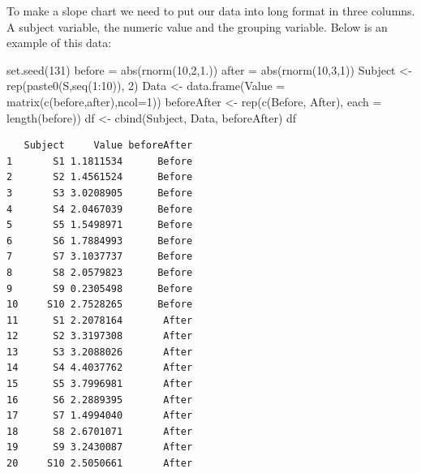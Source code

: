 \documentclass[
  letterpaper,
  DIV=11,
  numbers=noendperiod]{scrreprt}
\newenvironment{Shaded}{\begin{snugshade}}{\end{snugshade}}
\newcommand{\AttributeTok}[1]{\textcolor[rgb]{0.40,0.45,0.13}{#1}}
\newcommand{\DecValTok}[1]{\textcolor[rgb]{0.68,0.00,0.00}{#1}}
\newcommand{\FloatTok}[1]{\textcolor[rgb]{0.68,0.00,0.00}{#1}}
\newcommand{\FunctionTok}[1]{\textcolor[rgb]{0.28,0.35,0.67}{#1}}
\newcommand{\NormalTok}[1]{\textcolor[rgb]{0.00,0.23,0.31}{#1}}
\newcommand{\OtherTok}[1]{\textcolor[rgb]{0.00,0.23,0.31}{#1}}
\newcommand{\SpecialCharTok}[1]{\textcolor[rgb]{0.37,0.37,0.37}{#1}}
\newcommand{\StringTok}[1]{\textcolor[rgb]{0.13,0.47,0.30}{#1}}
\begin{document}
To make a slope chart we need to put our data into long format in three
columns. A subject variable, the numeric value and the grouping
variable. Below is an example of this data:

\begin{Shaded}
\begin{Highlighting}[]
\FunctionTok{set.seed}\NormalTok{(}\DecValTok{131}\NormalTok{) }
\NormalTok{before }\OtherTok{=} \FunctionTok{abs}\NormalTok{(}\FunctionTok{rnorm}\NormalTok{(}\DecValTok{10}\NormalTok{,}\DecValTok{2}\NormalTok{,}\FloatTok{1.}\NormalTok{))}
\NormalTok{after }\OtherTok{=} \FunctionTok{abs}\NormalTok{(}\FunctionTok{rnorm}\NormalTok{(}\DecValTok{10}\NormalTok{,}\DecValTok{3}\NormalTok{,}\DecValTok{1}\NormalTok{))}
\NormalTok{Subject }\OtherTok{\textless{}{-}} \FunctionTok{rep}\NormalTok{(}\FunctionTok{paste0}\NormalTok{(}\StringTok{\textquotesingle{}S\textquotesingle{}}\NormalTok{,}\FunctionTok{seq}\NormalTok{(}\DecValTok{1}\SpecialCharTok{:}\DecValTok{10}\NormalTok{)), }\DecValTok{2}\NormalTok{)}
\NormalTok{Data }\OtherTok{\textless{}{-}} \FunctionTok{data.frame}\NormalTok{(}\AttributeTok{Value =} \FunctionTok{matrix}\NormalTok{(}\FunctionTok{c}\NormalTok{(before,after),}\AttributeTok{ncol=}\DecValTok{1}\NormalTok{))}
\NormalTok{beforeAfter }\OtherTok{\textless{}{-}} \FunctionTok{rep}\NormalTok{(}\FunctionTok{c}\NormalTok{(}\StringTok{\textquotesingle{}Before\textquotesingle{}}\NormalTok{, }\StringTok{\textquotesingle{}After\textquotesingle{}}\NormalTok{), }\AttributeTok{each =} \FunctionTok{length}\NormalTok{(before))}
\NormalTok{df }\OtherTok{\textless{}{-}} \FunctionTok{cbind}\NormalTok{(Subject, Data, beforeAfter)}
\NormalTok{df}
\end{Highlighting}
\end{Shaded}

\begin{verbatim}
   Subject     Value beforeAfter
1       S1 1.1811534      Before
2       S2 1.4561524      Before
3       S3 3.0208905      Before
4       S4 2.0467039      Before
5       S5 1.5498971      Before
6       S6 1.7884993      Before
7       S7 3.1037737      Before
8       S8 2.0579823      Before
9       S9 0.2305498      Before
10     S10 2.7528265      Before
11      S1 2.2078164       After
12      S2 3.3197308       After
13      S3 3.2088026       After
14      S4 4.4037762       After
15      S5 3.7996981       After
16      S6 2.2889395       After
17      S7 1.4994040       After
18      S8 2.6701071       After
19      S9 3.2430087       After
20     S10 2.5050661       After
\end{verbatim}
\end{document}
